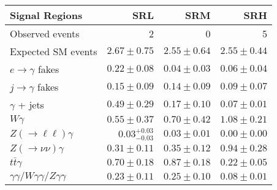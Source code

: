 \begin{tabular}{lrrr}
\hline
Signal Regions & SRL & SRM & SRH \\
\hline
Observed events & 2 & 0 & 5 \\
\hline
Expected SM events & $2.67 \pm 0.75$ & $2.55 \pm 0.64$ & $2.55 \pm 0.44$ \\
\hline
$e\rightarrow\gamma$ fakes & $0.22 \pm 0.08$ & $0.04 \pm 0.03$ & $0.06 \pm 0.04$ \\
$j\rightarrow\gamma$ fakes & $0.15 \pm 0.09$ & $0.14 \pm 0.09$ & $0.09 \pm 0.07$ \\
$\gamma$ + jets & $0.49 \pm 0.29$ & $0.17 \pm 0.10$ & $0.07 \pm 0.01$ \\
$W\gamma$ & $0.55 \pm 0.37$ & $0.70 \pm 0.42$ & $1.08 \pm 0.21$ \\
$Z(\rightarrow\ell\ell)\gamma$ & $0.03_{-0.03}^{+0.03}$ & $0.03 \pm 0.01$ & $0.00 \pm 0.00$ \\
$Z(\rightarrow\nu\nu)\gamma$ & $0.31 \pm 0.11$ & $0.35 \pm 0.12$ & $0.94 \pm 0.28$ \\
$t\bar{t}\gamma$ & $0.70 \pm 0.18$ & $0.87 \pm 0.18$ & $0.22 \pm 0.05$ \\
$\gamma\gamma / W\gamma\gamma / Z\gamma\gamma$ & $0.23 \pm 0.11$ & $0.25 \pm 0.10$ & $0.08 \pm 0.01$ \\
\hline
\end{tabular}
